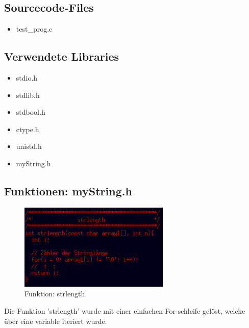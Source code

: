 \documentclass{scrartcl}
\begin{document}
\subsection{Sourcecode-Files}
\begin{itemize}
\item test\_prog.c
\end{itemize}

\subsection{Verwendete Libraries}
\begin{itemize}
\item stdio.h
\item stdlib.h
\item stdbool.h
\item ctype.h
\item unistd.h
\item myString.h
\end{itemize}

\subsection{Funktionen: myString.h}
\begin{figure}[H]
  \centering
  \includegraphics[width=0.9\linewidth]{images/strlength.png}
  \caption{Funktion: strlength}
  \label{fig:digraph}
\end{figure}
Die Funktion 'strlength' wurde mit einer einfachen For-schleife gelöst, welche über eine variable iteriert wurde.
\end{document}

